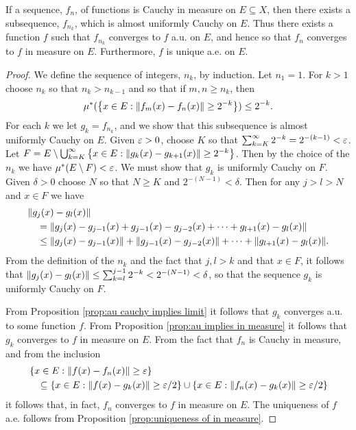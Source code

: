 \begin{theorem}\label{thm:riesz weyl}
If a sequence, $f_n$, of functions is Cauchy in measure on $E\subseteq X$, then there exists a subsequence, $f_{n_k}$, which is almost uniformly Cauchy on $E$. Thus there exists a function $f$ such that $f_{n_k}$ converges to $f$ a.u. on $E$, and hence so that $f_n$ converges to $f$ in measure on $E$. Furthermore, $f$ is unique a.e. on $E$.
\end{theorem}

\begin{proof}
We define the sequence of integers, $n_k$, by induction. Let $n_1=1$. For $k>1$ choose $n_k$ so that $n_k>n_{k-1}$ and so that if $m,n\geq n_k$, then \[\mu^*(\left\{x\in E:\norm{f_m(x)-f_n(x)}\geq2^{-k}\right\})\leq 2^{-k}.\] For each $k$ we let $g_k=f_{n_k}$, and we show that this subsequence is almost uniformly Cauchy on $E$. Given $\varepsilon>0$, choose $K$ so that $\sum_{k=K}^\infty 2^{-k}=2^{-(k-1)}<\varepsilon$. Let $F=E\setminus\bigcup_{k=K}^\infty\left\{x\in E:\norm{g_k(x)-g_{k+1}(x)}\geq2^{-k}\right\}$. Then by the choice of the $n_k$ we have $\mu^*(E\setminus F)<\varepsilon$. We must show that $g_k$ is uniformly Cauchy on $F$. Given $\delta>0$ choose $N$ so that $N\geq K$ and $2^{-(N-1)}<\delta$. Then for any $j>l>N$ and $x\in F$ we have
\begin{align*}
&\norm{g_j(x)-g_l(x)}\\
&\quad=\norm{g_j(x)-g_{j-1}(x)+g_{j-1}(x)-g_{j-2}(x)+\dots+g_{l+1}(x)-g_l(x)}\\
&\quad\leq\norm{g_j(x)-g_{j-1}(x)}+\norm{g_{j-1}(x)-g_{j-2}(x)}+\dots+\norm{g_{l+1}(x)-g_l(x)}.
\end{align*}
From the definition of the $n_k$ and the fact that $j,l>k$ and that $x\in F$, it follows that $\norm{g_j(x)-g_l(x)}\leq\sum_{k=l}^{j-1}2^{-k}<2^{-(N-1)}<\delta$, so that the sequence $g_k$ is uniformly Cauchy on $F$.

From Proposition \ref{prop:au cauchy implies limit} it follows that $g_k$ converges a.u. to some function $f$. From Proposition \ref{prop:au implies in measure} it follows that $g_k$ converges to $f$ in measure on $E$. From the fact that $f_n$ is Cauchy in measure, and from the inclusion
\begin{align*}
&\left\{x\in E:\norm{f(x)-f_n(x)}\geq\varepsilon\right\}\\
&\quad\subseteq\left\{x\in E:\norm{f(x)-g_k(x)}\geq\varepsilon/2\right\}\cup\left\{x\in E:\norm{f_n(x)-g_k(x)}\geq\varepsilon/2\right\}
\end{align*}
it follows that, in fact, $f_n$ converges to $f$ in measure on $E$. The uniqueness of $f$ a.e. follows from Proposition \ref{prop:uniqueness of in measure}.
\end{proof}

